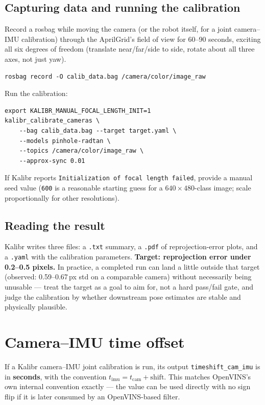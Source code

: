 \documentclass[11pt]{report}
\begin{document}
\subsection{Capturing data and running the calibration}

Record a rosbag while moving the camera (or the robot itself, for a joint
camera--IMU calibration) through the AprilGrid's field of view for 60--90
seconds, exciting all six degrees of freedom (translate near/far/side to
side, rotate about all three axes, not just yaw).

\begin{lstlisting}[style=shell]
rosbag record -O calib_data.bag /camera/color/image_raw
\end{lstlisting}

Run the calibration:

\begin{lstlisting}[style=shell]
export KALIBR_MANUAL_FOCAL_LENGTH_INIT=1
kalibr_calibrate_cameras \
    --bag calib_data.bag --target target.yaml \
    --models pinhole-radtan \
    --topics /camera/color/image_raw \
    --approx-sync 0.01
\end{lstlisting}

If Kalibr reports \texttt{Initialization of focal length failed}, provide a
manual seed value (\texttt{600} is a reasonable starting guess for a
$640\times480$-class image; scale proportionally for other resolutions).

\subsection{Reading the result}

Kalibr writes three files: a \texttt{.txt} summary, a \texttt{.pdf} of
reprojection-error plots, and a \texttt{.yaml} with the calibration
parameters. \textbf{Target: reprojection error under 0.2--0.5 pixels.} In
practice, a completed run can land a little outside that target (observed:
0.59--0.67\,px std on a comparable camera) without necessarily being
unusable --- treat the target as a goal to aim for, not a hard pass/fail
gate, and judge the calibration by whether downstream pose estimates are
stable and physically plausible.

\section{Camera--IMU time offset}

If a Kalibr camera--IMU joint calibration is run, its output
\texttt{timeshift\_cam\_imu} is in \textbf{seconds}, with the convention
$t_{\mathrm{imu}} = t_{\mathrm{cam}} + \mathrm{shift}$. This matches
OpenVINS's own internal convention exactly --- the value can be used
directly with no sign flip if it is later consumed by an OpenVINS-based
filter.
\end{document}
